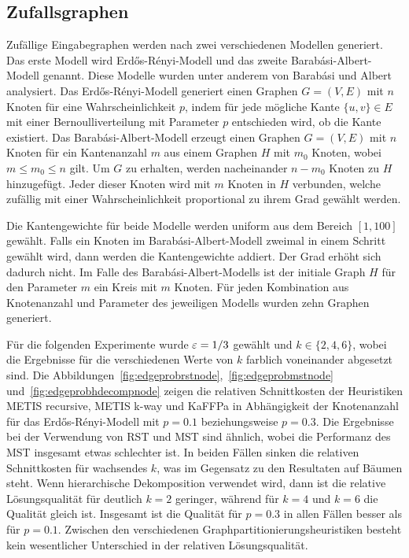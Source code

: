 \subsection{Zufallsgraphen}
Zufällige Eingabegraphen werden nach zwei verschiedenen Modellen generiert.
Das erste Modell wird Erdős-Rényi-Modell und das zweite Barabási-Albert-Modell genannt.
Diese Modelle wurden unter anderem von Barabási und Albert~\cite{AB02} analysiert.
Das Erdős-Rényi-Modell generiert einen Graphen $G=(V,E)$ mit $n$ Knoten für eine Wahrscheinlichkeit $p$, indem für jede mögliche Kante $\{u, v\} \in E$ mit einer Bernoulliverteilung mit Parameter $p$ entschieden wird, ob die Kante existiert.
Das Barabási-Albert-Modell erzeugt einen Graphen $G=(V,E)$ mit $n$ Knoten für ein Kantenanzahl $m$ aus einem Graphen $H$ mit $m_0$ Knoten, wobei $m \leq m_0 \leq n$ gilt.
Um $G$ zu erhalten, werden nacheinander $n - m_0$ Knoten zu $H$ hinzugefügt.
Jeder dieser Knoten wird mit $m$ Knoten in $H$ verbunden, welche zufällig mit einer Wahrscheinlichkeit proportional zu ihrem Grad gewählt werden.

Die Kantengewichte für beide Modelle werden uniform aus dem Bereich $[1, 100]$ gewählt.
Falls ein Knoten im Barabási-Albert-Modell zweimal in einem Schritt gewählt wird, dann werden die Kantengewichte addiert.
Der Grad erhöht sich dadurch nicht.
Im Falle des Barabási-Albert-Modells ist der initiale Graph $H$ für den Parameter $m$ ein Kreis mit $m$ Knoten.
Für jeden Kombination aus Knotenanzahl und Parameter des jeweiligen Modells wurden zehn Graphen generiert.

Für die folgenden Experimente wurde $\varepsilon=1/3$ gewählt und $k \in \{2, 4, 6\}$, wobei die Ergebnisse für die verschiedenen Werte von $k$ farblich voneinander abgesetzt sind.
Die Abbildungen~\ref{fig:edgeprobrstnode},~\ref{fig:edgeprobmstnode} und~\ref{fig:edgeprobhdecompnode} zeigen die relativen Schnittkosten der Heuristiken METIS recursive, METIS k-way und KaFFPa in Abhängigkeit der Knotenanzahl für das Erdős-Rényi-Modell mit $p=0.1$ beziehungsweise $p=0.3$.
Die Ergebnisse bei der Verwendung von RST und MST sind ähnlich, wobei die Performanz des MST insgesamt etwas schlechter ist.
In beiden Fällen sinken die relativen Schnittkosten für wachsendes $k$, was im Gegensatz zu den Resultaten auf Bäumen steht.
Wenn hierarchische Dekomposition verwendet wird, dann ist die relative Lösungsqualität für deutlich $k=2$ geringer, während für $k=4$ und $k=6$ die Qualität gleich ist.
Insgesamt ist die Qualität für $p=0.3$ in allen Fällen besser als für $p=0.1$.
Zwischen den verschiedenen Graphpartitionierungsheuristiken besteht kein wesentlicher Unterschied in der relativen Lösungsqualität.

